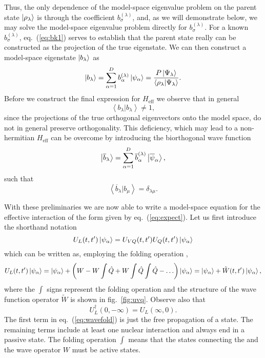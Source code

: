 Thus, the only dependence of the model-space eigenvalue problem
on the parent state $\left| \rho_{\lambda} \right\rangle$ is through the
coefficient $b_{\sigma}^{(\lambda )}$, and, as we will 
demonstrate below, we may solve the model-space eigenvalue
problem directly for $b_{\sigma}^{(\lambda )}$. 
For a known $b_{\sigma}^{(\lambda )}$, 
eq.\ (\ref{eq:bk1}) serves to establish that the parent state 
really can be constructed as the projection of the true eigenstate. We can
then construct a model-space eigenstate $\left| b_{\lambda} \right\rangle$ as
\begin{equation}
     \left| b_{\lambda} \right\rangle=\sum_{\alpha =1}^{D}
     b_{\alpha}^{(\lambda )}\left| \psi_{\alpha} \right\rangle=
     \frac{P\left| \Psi_{\lambda} \right\rangle}
     {\left\langle\rho_{\lambda} | \Psi_{\lambda} \right\rangle}.
     \label{eq:wfb}
\end{equation}
Before we construct the final expression for $H_{\mathrm{eff}}$ we observe that in general
\begin{equation}
    {\left\langle b_{\lambda} | b_{\lambda} \right\rangle}\neq 1,
\end{equation}
since the projections of the true orthogonal eigenvectors onto the 
model space, do not in general preserve orthogonality. This deficiency, which
may lead to a non-hermitian $H_{\mathrm{eff}}$ can be overcome by introducing the 
biorthogonal wave function
\begin{equation}
     \left| \overline{b}_{\lambda} \right\rangle=\sum_{\alpha=1}^{D}
      \overline{b}_{\alpha}^{(\lambda )}
     \left| \overline{\psi}_{\alpha} \right\rangle,
     \label{wfbi}
\end{equation}
such that 
\begin{equation}
     {\left\langle \overline{b}_{\lambda} | b_{\mu} \right\rangle}=
     \delta_{\lambda\mu}.
\end{equation}

With these preliminaries we are now able to write a model-space equation
for the effective interaction of the form given by eq.\
(\ref{eq:expect}). 
Let us first introduce the shorthand notation
\begin{equation}
    U_L(t,t')\left| \psi_{\alpha} \right\rangle=U_{VQ}(t,t' )U_Q(t,t' )\left| \psi_{\alpha} \right\rangle
\end{equation}
which can be written as, employing the folding operation \cite{ko90},
\begin{equation}
    U_L(t,t')\left| \psi_{\alpha} \right\rangle=\left| \psi_{\alpha} \right\rangle+
     \left( {\displaystyle W-W\int\hat{Q} 
    +W\int\hat{Q}\int\hat{Q} -\dots}\right)\left| \psi_{\alpha} \right\rangle
    =\left| \psi_{\alpha} \right\rangle +\tilde{W}(t,t')\left| \psi_{\alpha} \right\rangle,
\label{eq:wavefold}
\end{equation}
where the $\int$ signs represent the folding operation and the structure
of the wave function operator $\tilde{W}$ is shown in fig.\ \ref{fig:uvq}.
Observe also that 
\begin{equation}
U_L^{\dagger}(0,-\infty)=U_L(\infty ,0).
\end{equation}
The first term in eq.\ (\ref{eq:wavefold}) is just the free propagation 
of a state. The remaining terms include at least one nuclear interaction
and always end in a passive state. The folding operation $\int$ 
means that the states
connecting the \qbox and the wave operator $W$  must be active states.

